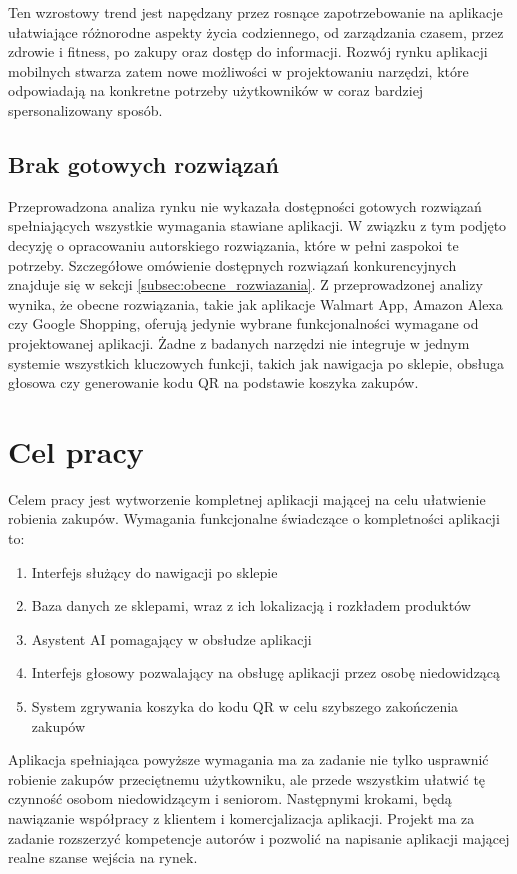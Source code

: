 Ten wzrostowy trend jest napędzany przez rosnące zapotrzebowanie na aplikacje ułatwiające różnorodne aspekty życia codziennego, od zarządzania czasem, przez zdrowie i fitness, po zakupy oraz dostęp do informacji. Rozwój rynku aplikacji mobilnych stwarza zatem nowe możliwości w projektowaniu narzędzi, które odpowiadają na konkretne potrzeby użytkowników w coraz bardziej spersonalizowany sposób.
\subsection{Brak gotowych rozwiązań}

Przeprowadzona analiza rynku nie wykazała dostępności gotowych rozwiązań spełniających wszystkie wymagania stawiane aplikacji. W związku z tym podjęto decyzję o opracowaniu autorskiego rozwiązania, które w pełni zaspokoi te potrzeby. Szczegółowe omówienie dostępnych rozwiązań konkurencyjnych znajduje się w sekcji \ref{subsec:obecne_rozwiazania}. Z przeprowadzonej analizy wynika, że obecne rozwiązania, takie jak aplikacje Walmart App, Amazon Alexa czy Google Shopping, oferują jedynie wybrane funkcjonalności wymagane od projektowanej aplikacji. Żadne z badanych narzędzi nie integruje w jednym systemie wszystkich kluczowych funkcji, takich jak nawigacja po sklepie, obsługa głosowa czy generowanie kodu QR na podstawie koszyka zakupów.

\section{Cel pracy}

Celem pracy jest wytworzenie kompletnej aplikacji mającej na celu ułatwienie robienia zakupów. Wymagania funkcjonalne świadczące o kompletności aplikacji to:
\begin{enumerate}
    \item Interfejs służący do nawigacji po sklepie
    \item Baza danych ze sklepami, wraz z ich lokalizacją i rozkładem produktów
    \item Asystent AI pomagający w obsłudze aplikacji
    \item Interfejs głosowy pozwalający na obsługę aplikacji przez osobę niedowidzącą
    \item System zgrywania koszyka do kodu QR w celu szybszego zakończenia zakupów
\end{enumerate}
Aplikacja spełniająca powyższe wymagania ma za zadanie nie tylko usprawnić robienie zakupów przeciętnemu użytkowniku, ale przede wszystkim ułatwić tę czynność osobom niedowidzącym i seniorom. Następnymi krokami, będą nawiązanie współpracy z klientem i komercjalizacja aplikacji. Projekt ma za zadanie rozszerzyć kompetencje autorów i pozwolić na napisanie aplikacji mającej realne szanse wejścia na rynek. 



